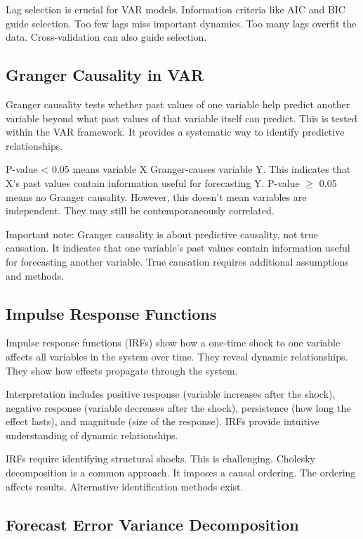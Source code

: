 Lag selection is crucial for VAR models. Information criteria like AIC and BIC guide selection. Too few lags miss important dynamics. Too many lags overfit the data. Cross-validation can also guide selection.

\subsection{Granger Causality in VAR}

Granger causality tests whether past values of one variable help predict another variable beyond what past values of that variable itself can predict. This is tested within the VAR framework. It provides a systematic way to identify predictive relationships.

P-value < 0.05 means variable X Granger-causes variable Y. This indicates that X's past values contain information useful for forecasting Y. P-value $\geq$ 0.05 means no Granger causality. However, this doesn't mean variables are independent. They may still be contemporaneously correlated.

Important note: Granger causality is about predictive causality, not true causation. It indicates that one variable's past values contain information useful for forecasting another variable. True causation requires additional assumptions and methods.

\subsection{Impulse Response Functions}

Impulse response functions (IRFs) show how a one-time shock to one variable affects all variables in the system over time. They reveal dynamic relationships. They show how effects propagate through the system.

Interpretation includes positive response (variable increases after the shock), negative response (variable decreases after the shock), persistence (how long the effect lasts), and magnitude (size of the response). IRFs provide intuitive understanding of dynamic relationships.

IRFs require identifying structural shocks. This is challenging. Cholesky decomposition is a common approach. It imposes a causal ordering. The ordering affects results. Alternative identification methods exist.

\subsection{Forecast Error Variance Decomposition}

